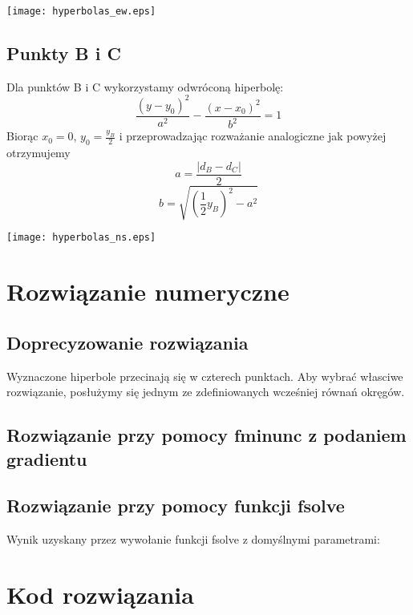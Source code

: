\documentclass[11pt]{article}
\begin{document}
\texttt{[image: hyperbolas\_ew.eps]}

\subsection{Punkty B i C}
Dla punktów B i C wykorzystamy odwróconą hiperbolę:
\[ \frac{(y-y_0)^2}{a^2} - \frac{(x-x_0)^2}{b^2} = 1 \]
Biorąc $x_0 = 0$, $y_0 = \frac{y_B}{2}$ i przeprowadzając rozważanie analogiczne
jak powyżej otrzymujemy
\[ a = \frac{|d_B - d_C|}{2} \]
\[ b = \sqrt{\left(\frac 1 2 y_B\right)^2 - a^2} \]

\texttt{[image: hyperbolas\_ns.eps]}

\section{Rozwiązanie numeryczne}
\subsection{Doprecyzowanie rozwiązania}
Wyznaczone hiperbole przecinają się w czterech punktach.  Aby wybrać własciwe
rozwiązanie, posłużymy się jednym ze zdefiniowanych wcześniej równań okręgów.

\subsection{Rozwiązanie przy pomocy fminunc z podaniem gradientu}


\subsection{Rozwiązanie przy pomocy funkcji fsolve}
Wynik uzyskany przez wywołanie funkcji fsolve z domyślnymi parametrami:


\section{Kod rozwiązania}

\end{document}
